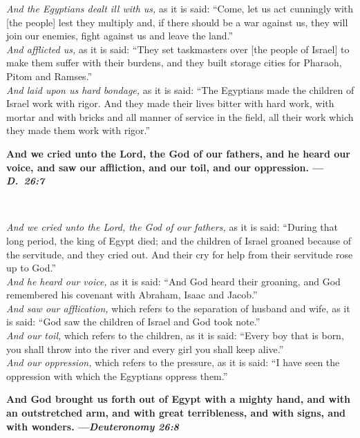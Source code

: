 \documentclass[a4paper,10pt,openany]{memoir}
\newcommand{\HgSource}[1]{\hfill{\small---\itshape{#1}}}
\newcommand{\HgHL}[1]{{\Large\textbf{#1}\par\noindent\\[-.5em]}}
\begin{document}
{\small
\noindent
{\itshape And the Egyptians dealt ill with us,} as it is said: ``Come, let us act
cunningly with [the people] lest they multiply and, if there should be a war
against us, they will join our enemies, fight against us and leave the
land.''\\[1em]
{\itshape And afflicted us,} as it is said: ``They set taskmasters over [the people of
Israel] to make them suffer with their burdens, and they built storage cities
for Pharaoh, Pitom and Ramses.''\\[1em]
{\itshape And laid upon us hard bondage,} as it is said: ``The Egyptians made the
children of Israel work with rigor. And they made their lives bitter with hard
work, with mortar and with bricks and all manner of service in the field, all
their work which they made them work with rigor.''
}

\pagebreak

\noindent
\HgHL{%
  And we cried unto the Lord, the
  God of our fathers, and he heard our voice, and saw our affliction, and our
  toil, and our oppression.
  \HgSource{D.\ 26:7}
}

\vspace{-1em}
{\small
\noindent
{\itshape And we cried unto the Lord, the God of our fathers,}
as it is said: ``During that long period, the king of Egypt died; and the
children of Israel groaned because of the servitude, and they cried out. And
their cry for help from their servitude rose up to God.''\\[1em]
{\itshape And he heard our voice,} as it is said: ``And God heard their
groaning, and God remembered his covenant with Abraham, Isaac and
Jacob.'' \\[1em]
{\itshape And saw our afflication,} which refers to the separation of husband
and wife, as it is said: ``God saw the children of Israel and God took
note.'' \\[1em]
{\itshape And our toil,} which refers to the children, as it is said: ``Every
boy that is born, you shall throw into the river and every girl you shall keep
alive.'' \\[1em]
{\itshape And our oppression,} which refers to the pressure, as it is said: ``I
have seen the oppression with which the Egyptians oppress them.'' \\[1em]
}

\vspace{-.6em}
\noindent
\HgHL{%
  And God brought us forth out of Egypt with a mighty hand, and with an
  outstretched arm, and with great terribleness, and with signs, and with
  wonders.
  \HgSource{Deuteronomy 26:8}
}
\end{document}
